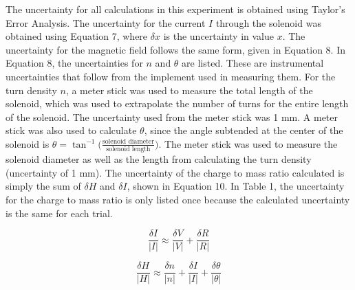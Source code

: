 \documentclass[%
 aip,
 amsmath,amssymb,
 reprint,%
floatfix,
]{revtex4-1}
\begin{document}
The uncertainty for all calculations in this experiment is obtained using Taylor's Error Analysis\cite{Taylor1996}. The uncertainty for the current $I$ through the solenoid was obtained using Equation 7, where $\delta x$ is the uncertainty in value $x$. The uncertainty for the magnetic field follows the same form, given in Equation 8. In Equation 8, the uncertainties for $n$ and $\theta$ are listed. These are instrumental uncertainties that follow from the implement used in measuring them. For the turn density $n$, a meter stick was used to measure the total length of the solenoid, which was used to extrapolate the number of turns for the entire length of the solenoid. The uncertainty used from the meter stick was 1 mm. A meter stick was also used to calculate $\theta$, since the angle subtended at the center of the solenoid is $\theta = \tan^{-1}\big({\frac{\text{solenoid diameter}}{\text{solenoid length}}}\big)$. The meter stick was used to measure the solenoid diameter as well as the length from calculating the turn density (uncertainty of 1 mm). The uncertainty of the charge to mass ratio calculated is simply the sum of $\delta H$ and $\delta I$, shown in Equation 10. In Table 1, the uncertainty for the charge to mass ratio is only listed once because the calculated uncertainty is the same for each trial.


\begin{equation}
	\frac{\delta I}{\lvert I \rvert} \approx \frac{\delta V}{\lvert V \rvert} + \frac{\delta R}{\lvert R \rvert}
\end{equation}

\begin{equation}
	\frac{\delta H}{\lvert H \rvert} \approx \frac{\delta n}{\lvert n \rvert} + \frac{\delta I}{\lvert I \rvert} + \frac{\delta \theta}{\lvert \theta \rvert}
\end{equation}
\end{document}
